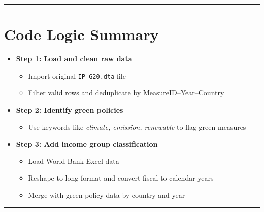 \documentclass[
  letterpaper,
  DIV=11,
  numbers=noendperiod]{scrartcl}
\providecommand{\tightlist}{%
  \setlength{\itemsep}{0pt}\setlength{\parskip}{0pt}}
\begin{document}
\begin{center}\rule{0.5\linewidth}{0.5pt}\end{center}

\section{Code Logic Summary}\label{code-logic-summary}

\begin{itemize}
\tightlist
\item
  \textbf{Step 1: Load and clean raw data}

  \begin{itemize}
  \tightlist
  \item
    Import original \texttt{IP\_G20.dta} file\\
  \item
    Filter valid rows and deduplicate by MeasureID--Year--Country
  \end{itemize}
\item
  \textbf{Step 2: Identify green policies}

  \begin{itemize}
  \tightlist
  \item
    Use keywords like \emph{climate, emission, renewable} to flag green
    measures
  \end{itemize}
\item
  \textbf{Step 3: Add income group classification}

  \begin{itemize}
  \tightlist
  \item
    Load World Bank Excel data\\
  \item
    Reshape to long format and convert fiscal to calendar years\\
  \item
    Merge with green policy data by country and year
  \end{itemize}
\end{itemize}

\begin{center}\rule{0.5\linewidth}{0.5pt}\end{center}
\end{document}
